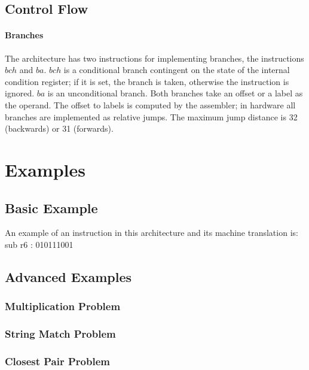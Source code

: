\documentclass{article}
\begin{document}
    \subsection{Control Flow}

    \paragraph{Branches}
    The architecture has two instructions for implementing branches, the
    instructions $bch$ and $ba$. $bch$ is a conditional branch contingent on the
    state of the internal condition register; if it is set, the branch is taken,
    otherwise the instruction is ignored. $ba$ is an unconditional branch. Both
    branches take an offset or a label as the operand. The offset to labels is
    computed by the assembler; in hardware all branches are implemented as
    relative jumps. The maximum jump distance is 32 (backwards) or 31
    (forwards).

    \section{Examples}

    \subsection{Basic Example}

    An example of an instruction in this architecture and its machine
    translation is:
    \vspace{2.5mm}
    \newline
    sub r6 : 010111001

    \subsection{Advanced Examples}

    \subsubsection{Multiplication Problem}

    

    \subsubsection{String Match Problem}

    

    \subsubsection{Closest Pair Problem}

    
\end{document}
